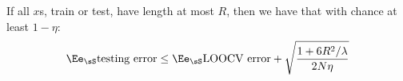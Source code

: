         If all $x$s, train or test, have length at most $R$, then
        we have that with chance at least $1-\eta$:
        $$
            \Ee_{\sS}
            \text{testing error}
            \leq
            \Ee_{\sS}
            \text{LOOCV error}
            +
            \sqrt{\frac{1+6R^2/\lambda}{2N\eta}}
        $$








